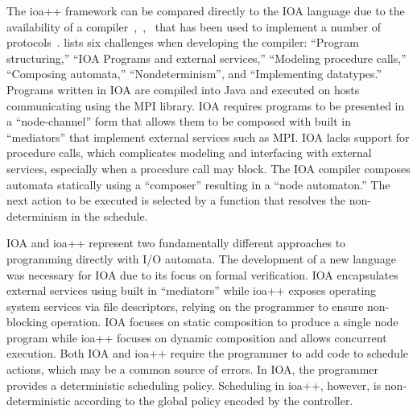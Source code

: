 The ioa++ framework can be compared directly to the IOA language due to the availability of a compiler~\cite{tsai2002code},~\cite{tauber2004verifiable},~\cite{tauber2004compiling} that has been used to implement a number of protocols~\cite{georgiou2009automated}.
\cite{georgiou2009automated} lists six challenges when developing the compiler: ``Program structuring,'' ``IOA Programs and external services,'' ``Modeling procedure calls,'' ``Composing automata,'' ``Nondeterminism'', and ``Implementing datatypes.''
Programs written in IOA are compiled into Java and executed on hosts communicating using the MPI library.
IOA requires programs to be presented in a ``node-channel'' form that allows them to be composed with built in ``mediators'' that implement external services such as MPI.
IOA lacks support for procedure calls, which complicates modeling and interfacing with external services, especially when a procedure call may block.
The IOA compiler composes automata statically using a ``composer'' resulting in a ``node automaton.''
The next action to be executed is selected by a function that resolves the non-determinism in the schedule.

IOA and ioa++ represent two fundamentally different approaches to programming directly with I/O automata.
The development of a new language was necessary for IOA due to its focus on formal verification.
IOA encapsulates external services using built in ``mediators'' while ioa++ exposes operating system services via file descriptors, relying on the programmer to ensure non-blocking operation.
IOA focuses on static composition to produce a single node program while ioa++ focuses on dynamic composition and allows concurrent execution.
Both IOA and ioa++ require the programmer to add code to schedule actions, which may be a common source of errors.
In IOA, the programmer provides a deterministic scheduling policy.
Scheduling in ioa++, however, is non-deterministic according to the global policy encoded by the controller.










